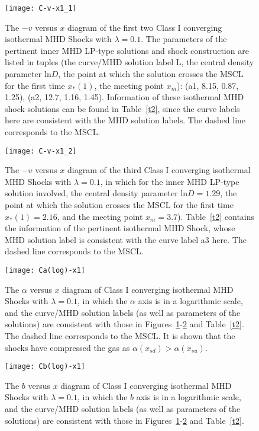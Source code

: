 \documentclass[fleqn,usenatbib]{mnras}
\begin{document}
\begin{figure}
\centering
\texttt{[image: C-v-x1\_1]}
\caption{The $-v$ versus $x$ diagram of the first two Class I converging isothermal MHD Shocks with $\lambda=0.1$. The parameters of the pertinent inner MHD LP-type solutions and shock construction are listed in tuples (the curve/MHD solution label L, the central density parameter $\mathrm{ln}D$, the point at which the solution crosses the MSCL for the first time $x_{*}(1)$, the meeting point $x_{m}$): (a1, 8.15, 0.87, 1.25), (a2, 12.7, 1.16, 1.45). Information of these isothermal MHD shock solutions can be found in Table~\ref{t2}, since the curve labels here are consistent with the MHD solution labels. The dashed line corresponds to the MSCL.}
\label{4}
\end{figure}

\begin{figure}
\centering
\texttt{[image: C-v-x1\_2]}
\caption{ 
The $-v$ versus $x$ diagram of the third Class I converging isothermal MHD Shocks with $\lambda=0.1$, in which for the inner MHD LP-type solution involved, the central density parameter $\mathrm{ln}D=1.29$, the point at which the solution crosses the MSCL for the first time $x_{*}(1)=2.16$, and the meeting point $x_{m}=3.7$). Table~\ref{t2} contains the information of the pertinent isothermal MHD Shock, whose MHD solution label is consistent with the curve label a3 here. The dashed line corresponds to the MSCL.}
\label{5}
\end{figure}

\begin{figure}
\centering
\texttt{[image: Ca(log)-x1]}
\caption{The $\alpha$ versus $x$ diagram of Class I converging isothermal MHD Shocks with $\lambda=0.1$, in which the $\alpha$ axis is in a logarithmic scale, and the curve/MHD solution labels (as well as parameters of the solutions) are consistent with those in Figures~\ref{4}-\ref{5} and Table~\ref{t2}. The dashed line corresponds to the MSCL. It is shown that the shocks have compressed the gas as $\alpha(x_{sd})>\alpha(x_{su})$.}
\label{6}
\end{figure}

\begin{figure}
\centering
\texttt{[image: Cb(log)-x1]}
\caption{The $b$ versus $x$ diagram of Class I converging isothermal MHD Shocks with $\lambda=0.1$, in which the $b$ axis is in a logarithmic scale, and the curve/MHD solution labels (as well as parameters of the solutions) are consistent with those in Figures~\ref{4}-\ref{5} and Table~\ref{t2}.}
\label{7}
\end{figure}
\end{document}
